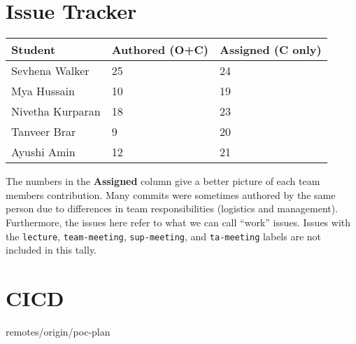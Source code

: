 \documentclass{article}
\begin{document}
\section{Issue Tracker}


\begin{table}[H]
\centering
\begin{tabular}{lll}
\toprule
\textbf{Student} & \textbf{Authored (O+C)} & \textbf{Assigned (C only)}\\
\midrule
Sevhena Walker & 25 & 24 \\
Mya Hussain & 10 & 19 \\
Nivetha Kurparan & 18 & 23 \\
Tanveer Brar & 9 & 20 \\
Ayushi Amin & 12 & 21 \\
\bottomrule
\end{tabular}
\end{table}

The numbers in the \textbf{Assigned} column give a better picture of each team members contribution. Many commits were sometimes authored by the same person due to differences in team responsibilities (logistics and management). Furthermore, the issues here refer to what we can call ``work'' issues. Issues with the \texttt{lecture}, \texttt{team-meeting}, \texttt{sup-meeting}, and \texttt{ta-meeting} labels are not included in this tally.

\section{CICD}


 remotes/origin/poc-plan
\end{document}
